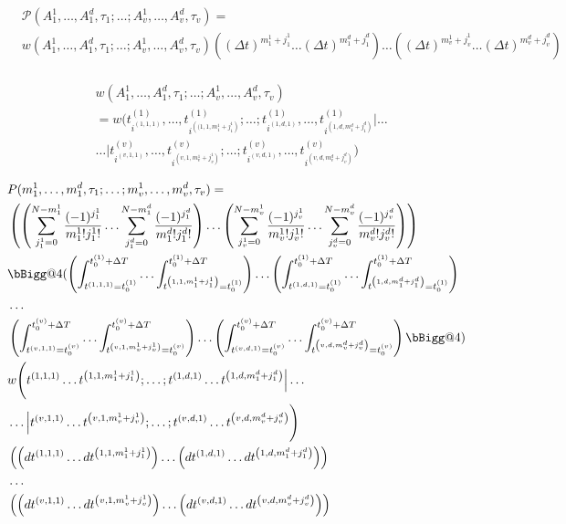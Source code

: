 \documentclass[12pt]{article}
\makeatletter
\newcommand{\vast}{\bBigg@{4}}
\makeatother
\begin{document}
\begin{align}
&\mathcal{P}(A_1^1, \ldots, A_1^d, \tau_1 ; \ldots ; A_v^1, \ldots,A_v^d,\tau_v) =\\
&w(A_1^1, \ldots, A_1^d, \tau_1 ; \ldots ; A_v^1, \ldots,A_v^d,\tau_v) \left((\Delta t)^{m_1^1+j_1^1}\ldots (\Delta t)^{m_1^d+j_1^d} \right) \ldots \left((\Delta t)^{m_v^1+j_v^1}\ldots (\Delta t)^{m_v^d+j_v^d} \right)\\
\end{align}

\begin{align}
&w(A_1^1, \ldots, A_1^d, \tau_1 ; \ldots ; A_v^1, \ldots,A_v^d,\tau_v)\\
&=w\Bigg(t^{(1)}_{i^{(1,1,1)}},\ldots,t^{(1)}_{i^{\left((1,1,m_1^1+j_1^1\right)}} 
;\ldots; t^{(1)}_{i^{(1,d,1)}},\ldots,t^{(1)}_{i^{\left(1,d,m_1^d+j_1^d\right)}}
\big\vert \ldots\\
&\ldots \big\vert
t^{(v)}_{i^{(v,1,1)}},\ldots,t^{(v)}_{i^{\left(v,1,m_v^1+j_v^1\right)}}
;\ldots; t^{(v)}_{i^{(v,d,1)}},\ldots,t^{(v)}_{i^{\left(v,d,m_v^d+j_v^d\right)}}
\Bigg)
\end{align}
	
\begin{align}
&P(m_1^1,\ldots,m_1^d,\tau_1; \ldots ; m_v^1, \ldots, m_v^d, \tau_v) =\\
&\left(\left(\sum_{j_1^1=0}^{N-m_1^1}\frac{(-1)^{j_1^1}}{m_1^1!j_1^1!} 
\ldots \sum_{j_1^d=0}^{N-m_1^d}\frac{(-1)^{j_1^d}}{m_1^d!j_1^d!} \right) 
\ldots
\left(\sum_{j_v^1=0}^{N-m_v^1}\frac{(-1)^{j_v^1}}{m_v^1!j_v^1!} 
\ldots \sum_{j_v^d=0}^{N-m_v^d}\frac{(-1)^{j_v^d}}{m_v^d!j_v^d!} \right) \right)\\
&\vast(\left(\int_{t^{(1,1,1)} = t^{(1)}_0}^{t_0^{(1)}+\Delta T} \ldots \int_{t^{\left(1,1,m_1^1+j_1^1\right)} = t^{(1)}_0}^{t_0^{(1)}+\Delta T}\right) \ldots \left(\int_{t^{(1,d,1)} = t^{(1)}_0}^{t_0^{(1)}+\Delta T} \ldots \int_{t^{\left(1,d,m_1^d+j_1^d\right)} = t^{(1)}_0}^{t_0^{(1)}+\Delta T}\right)\\
&\ldots\\
&\left(\int_{t^{(v,1,1)} = t^{(v)}_0}^{t_0^{(v)}+\Delta T} \ldots \int_{t^{\left(v,1,m_v^1+j_v^1\right)} = t^{(v)}_0}^{t_0^{(v)}+\Delta T}\right) \ldots \left(\int_{t^{(v,d,1)} = t^{(v)}_0}^{t_0^{(v)}+\Delta T} \ldots \int_{t^{\left(v,d, m_v^d+j_v^d\right)} = t^{(v)}_0}^{t_0^{(v)}+\Delta T}\right)\vast)\\
&w\Bigg(t^{(1,1,1)}\ldots t^{\left(1,1,m_1^1+j_1^1\right)};\ldots;t^{(1,d,1)}\ldots t^{\left(1,d,m_1^d+j_1^d\right)}\Big| \ldots\\
&\ldots \Big| t^{(v,1,1)}\ldots t^{\left(v,1,m_v^1+j_v^1\right)};\ldots;t^{(v,d,1)}\ldots t^{\left(v,d,m_v^d+j_v^d\right)}\Bigg)\\
&\left( \left(dt^{(1,1,1)} \ldots dt^{\left(1,1,m_1^1+j_1^1\right)}\right) \ldots \left(dt^{(1,d,1)} \ldots dt^{\left(1,d,m_1^d+j_1^d\right)}\right) \right)\\
&\ldots\\
&\left( \left(dt^{(v,1,1)} \ldots dt^{\left(v,1,m_v^1+j_v^1\right)}\right) \ldots \left(dt^{(v,d,1)} \ldots dt^{\left(v,d,m_v^d+j_v^d\right)}\right) \right)\\
\end{align}	
\end{document}

